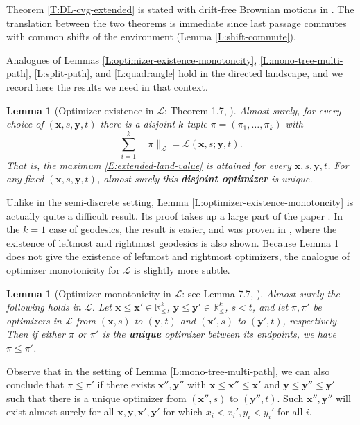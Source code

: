 \documentclass[11pt]{article}
\newcommand{\R}{\mathbb{R}}
\newcommand{\cL}{\mathcal{L}}
\newcommand{\bx}{\mathbf{x}}
\newcommand{\by}{\mathbf{y}}
\newtheorem{lemma}[theorem]{Lemma}
\theoremstyle{definition} %
\theoremstyle{remark} %
\begin{document}
Theorem \ref{T:DL-cvg-extended} is stated with drift-free Brownian motions in \cite{dauvergne2021disjoint}. The translation between the two theorems is immediate since last passage commutes with common shifts of the environment (Lemma \ref{L:shift-commute}).


 Analogues of Lemmas \ref{L:optimizer-existence-monotoncity}, \ref{L:mono-tree-multi-path}, \ref{L:split-path}, and \ref{L:quadrangle} hold in the directed landscape, and we record here the results we need in that context.

\begin{lemma}[Optimizer existence in $\cL$: Theorem 1.7, \cite{dauvergne2021disjoint}]
	\label{L:optimizer-existence-monotoncity-landscape}
Almost surely, for every choice of $(\bx, s, \by, t)$
there is a disjoint $k$-tuple $\pi = (\pi_1, \dots, \pi_k)$ with 
$$
\sum_{i=1}^k \|\pi\|_\cL = \cL(\bx, s; \by, t).
$$
That is, the maximum \eqref{E:extended-land-value} is attained for every $\bx, s, \by, t$. For any fixed $(\bx, s, \by, t)$, almost surely this \textbf{disjoint optimizer} is unique.
\end{lemma}





Unlike in the semi-discrete setting, Lemma \ref{L:optimizer-existence-monotoncity} is actually quite a difficult result. Its proof takes up a large part of the paper \cite{dauvergne2021disjoint}. In the $k = 1$ case of geodesics, the result is easier, and was proven in \cite[Theorem 1.7, Lemma 13.2]{DOV}, where the existence of leftmost and rightmost geodesics is also shown. Because Lemma \ref{L:optimizer-existence-monotoncity-landscape} does not give the existence of leftmost and rightmost optimizers, the analogue of optimizer monotonicity for $\cL$ is slightly more subtle.

\begin{lemma}[Optimizer monotonicity in $\cL$: see Lemma 7.7, \cite{dauvergne2021disjoint}]
	\label{L:mono-tree-multi-path-L}
	Almost surely the following holds in $\cL$.
	Let $\bx \le \bx' \in \R^k_\le$, $\by \le \by' \in \R^k_\le$, $s < t$, and let $\pi, \pi'$ be optimizers in $\cL$ from $(\bx, s)$ to $(\by, t)$ and $(\bx', s)$ to $(\by', t)$, respectively. Then if either $\pi$ or $\pi'$ is the \textbf{unique} optimizer between its endpoints, we have $\pi \le \pi'$.
\end{lemma}

Observe that in the setting of Lemma \ref{L:mono-tree-multi-path}, we can also conclude that $\pi \le \pi'$ if there exists $\bx'', \by''$ with $\bx \le \bx'' \le \bx'$ and $\by \le \by'' \le \by'$ such that there is a unique optimizer from $(\bx'', s)$ to $(\by'', t)$. Such $\bx'', \by''$ will exist almost surely for all $\bx, \by, \bx', \by'$ for which $x_i < x_i', y_i < y_i'$ for all $i$.
\end{document}
